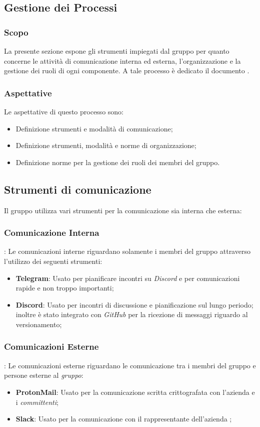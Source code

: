 \subsection{Gestione dei Processi} %
\subsubsection{Scopo}
La presente sezione espone gli strumenti impiegati dal gruppo \teamname{} per quanto concerne le attività di comunicazione interna ed esterna, l'organizzazione e la gestione dei ruoli di ogni componente. %
A tale processo è dedicato il documento \PdP{}.

\subsubsection{Aspettative}
Le aspettative di questo processo sono:
\begin{itemize}
	\item Definizione strumenti e modalità di comunicazione;
	\item Definizione strumenti, modalità e norme di organizzazione;
	\item Definizione norme per la gestione dei ruoli dei membri del gruppo.
\end{itemize}

\subsection{Strumenti di comunicazione}
Il gruppo \teamname{} utilizza vari strumenti per la comunicazione sia interna che esterna:
	\subsubsection{Comunicazione Interna}:
		Le comunicazioni interne riguardano solamente i membri del gruppo \teamname{} attraverso l'utilizzo dei seguenti strumenti:
			\begin{itemize}
				\item \textbf{Telegram}: Usato per pianificare incontri su \emph{Discord} e per comunicazioni rapide e non troppo importanti;
				\item \textbf{Discord}: Usato per incontri di discussione e pianificazione sul lungo periodo; inoltre è stato integrato con \emph{GitHub} per la ricezione di messaggi riguardo al versionamento;
			\end{itemize}
	\subsubsection{Comunicazioni Esterne}:
	\label{sec:Comunicazioni Esterne}
		Le comunicazioni esterne riguardano le comunicazione tra i membri del gruppo \teamname{} e persone esterne al \emph{gruppo}:
			\begin{itemize}
				\item \textbf{ProtonMail}: Usato per la comunicazione scritta crittografata con l'azienda \proponente{} e i \emph{committenti};
				\item \textbf{Slack}: Usato per la comunicazione con il rappresentante dell'azienda \proponente{};
			\end{itemize}

